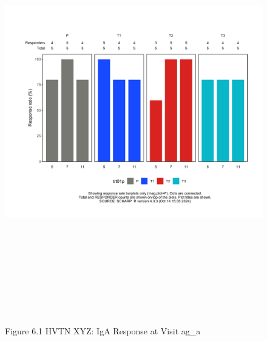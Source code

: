\documentclass[12pt]{article}
\begin{document}
\begin{figure}[H]

{\centering \includegraphics[width=8.75in,height=7.25in]{test_cases_files/figure-latex/unnamed-chunk-12-1} 

}

\caption[Figure 6.1 lineplot (pos. response boxplots)]{Figure 6.1 HVTN XYZ: IgA Response at Visit ag\_a}\label{fig:unnamed-chunk-12}
\end{figure}
\clearpage
\end{document}
